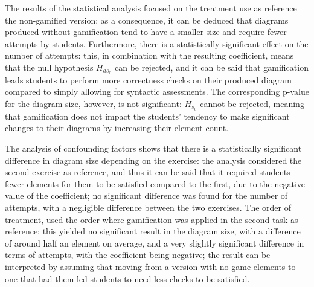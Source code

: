 The results of the statistical analysis focused on the treatment use as reference the non-gamified version: as a consequence, it can be deduced that diagrams produced without gamification tend to have a smaller size and require fewer attempts by students. Furthermore, there is a statistically significant effect on the number of attempts: this, in combination with the resulting coefficient, means that the null hypothesis ${H_{as_{0}}}$ can be rejected, and it can be said that gamification leads students to perform more correctness checks on their produced diagram compared to simply allowing for syntactic assessments. The corresponding p-value for the diagram size, however, is not significant: ${H_{s_{0}}}$ cannot be rejected, meaning that gamification does not impact the students' tendency to make significant changes to their diagrams by increasing their element count.

The analysis of confounding factors shows that there is a statistically significant difference in diagram size depending on the exercise: the analysis considered the second exercise as reference, and thus it can be said that it required students fewer elements for them to be satisfied compared to the first, due to the negative value of the coefficient; no significant difference was found for the number of attempts, with a negligible difference between the two exercises. The order of treatment, used the order where gamification was applied in the second task as reference: this yielded no significant result in the diagram size, with a difference of around half an element on average, and a very slightly significant difference in terms of attempts, with the coefficient being negative; the result can be interpreted by assuming that moving from a version with no game elements to one that had them led students to need less checks to be satisfied.


